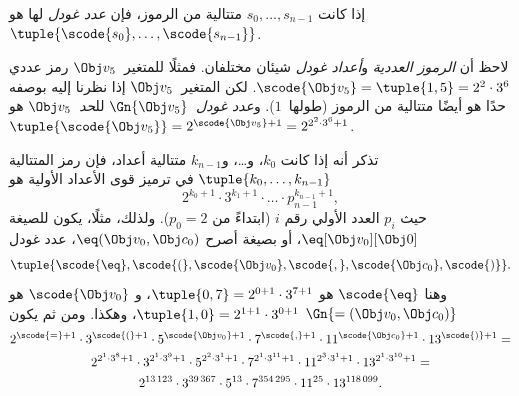 \documentclass[../../../include/open-logic-section]{subfiles}
\begin{document}
\begin{defn}
إذا كانت $s_0,\dots,s_{n-1}$ متتالية من الرموز، فإن \emph{عدد غودل}
لها هو $\tuple{\scode{s_0},\dots,\scode{s_{n-1}}}$.
\end{defn}

\begin{explain}
لاحظ أن \emph{الرموز العددية} و\emph{أعداد غودل} شيئان مختلفان.
فمثلًا للمتغير~$\Obj v_5$ رمز عددي
$\scode{\Obj v_5}=\tuple{1,5}=2^2\cdot3^6$. لكن المتغير~$\Obj v_5$
إذا نظرنا إليه بوصفه حدًا هو أيضًا متتالية من الرموز (طولها~$1$).
و\emph{عدد غودل}~$\Gn{\Obj v_5}$ لل\emph{حد}~$\Obj v_5$ هو
$\tuple{\scode{\Obj v_5}}=2^{\scode{\Obj v_5}+1}
=2^{2^2\cdot3^6+1}$.
\end{explain}

\begin{ex}
تذكر أنه إذا كانت $k_0$، و\dots، و$k_{n-1}$ متتالية أعداد، فإن رمز
المتتالية $\tuple{k_0,\dots,k_{n-1}}$ في ترميز قوى الأعداد الأولية هو
\[
2^{k_0+1}\cdot3^{k_1+1}\cdot \dots \cdot p_{n-1}^{k_{n-1}+1},
\]
حيث $p_i$ العدد الأولي رقم $i$ (ابتداءً من $p_0=2$). ولذلك، مثلًا،
يكون للصيغة $\eq[\Obj v_0][\Obj 0]$، أو بصيغة أصرح
${\eq}(\Obj v_0,\Obj c_0)$، عدد غودل
\[
\tuple{\scode{\eq},\scode{(},\scode{\Obj v_0},\scode{,}, \scode{\Obj
    c_0},\scode{)}}.
\]
وهنا $\scode{\eq}$ هو $\tuple{0,7}=2^{0+1}\cdot3^{7+1}$، و
$\scode{\Obj v_0}$ هو $\tuple{1,0}=2^{1+1}\cdot3^{0+1}$، وهكذا.
ومن ثم يكون $\Gn{=(\Obj v_0,\Obj c_0)}$
\begin{multline*}
2^{\scode{=} + 1}\cdot 3^{\scode{(}+1}\cdot 5^{\scode{\Obj v_0}+1}
\cdot 7^{\scode{,} + 1} \cdot 11^{\scode{\Obj c_0}+1} \cdot
13^{\scode{)}+1} = \\
2^{2^1\cdot 3^8 + 1}\cdot 3^{2^1\cdot 3^9+1}\cdot 5^{2^2\cdot 3^1+1}
\cdot 7^{2^1\cdot 3^{11} + 1} \cdot 11^{2^3\cdot3^1+1} \cdot
13^{2^1\cdot3^{10}+1} = \\
2^{13\,123}\cdot 3^{39\,367}\cdot 5^{13}\cdot 7^{354\,295}\cdot11^{25}\cdot13^{118\,099}.
\end{multline*}
\end{ex}
\end{document}
